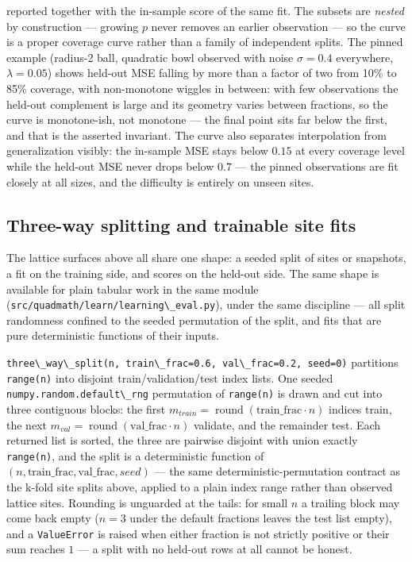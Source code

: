 \documentclass[
  10pt,
]{article}
\newcommand{\passthrough}[1]{#1}
\begin{document}
reported together with the in-sample score of the same fit. The subsets
are \emph{nested} by construction --- growing \(p\) never removes an
earlier observation --- so the curve is a proper coverage curve rather
than a family of independent splits. The pinned example (radius-2 ball,
quadratic bowl observed with noise \(\sigma = 0.4\) everywhere,
\(\lambda = 0.05\)) shows held-out MSE falling by more than a factor of
two from 10\% to 85\% coverage, with non-monotone wiggles in between:
with few observations the held-out complement is large and its geometry
varies between fractions, so the curve is monotone-ish, not monotone ---
the final point sits far below the first, and that is the asserted
invariant. The curve also separates interpolation from generalization
visibly: the in-sample MSE stays below \(0.15\) at every coverage level
while the held-out MSE never drops below \(0.7\) --- the pinned
observations are fit closely at all sizes, and the difficulty is
entirely on unseen sites.

\subsection{Three-way splitting and trainable site
fits}\label{sec:learn_three_way_site_fits}

The lattice surfaces above all share one shape: a seeded split of sites
or snapshots, a fit on the training side, and scores on the held-out
side. The same shape is available for plain tabular work in the same
module (\passthrough{\lstinline!src/quadmath/learn/learning\_eval.py!}),
under the same discipline --- all split randomness confined to the
seeded permutation of the split, and fits that are pure deterministic
functions of their inputs.

\passthrough{\lstinline!three\_way\_split(n, train\_frac=0.6, val\_frac=0.2, seed=0)!}
partitions \passthrough{\lstinline!range(n)!} into disjoint
train/validation/test index lists. One seeded
\passthrough{\lstinline!numpy.random.default\_rng!} permutation of
\passthrough{\lstinline!range(n)!} is drawn and cut into three
contiguous blocks: the first \(m_{train} =
\operatorname{round}(\mathrm{train\_frac} \cdot n)\) indices train, the
next \(m_{val} = \operatorname{round}(\mathrm{val\_frac} \cdot n)\)
validate, and the remainder test. Each returned list is sorted, the
three are pairwise disjoint with union exactly
\passthrough{\lstinline!range(n)!}, and the split is a deterministic
function of \((n, \mathrm{train\_frac}, \mathrm{val\_frac}, seed)\) ---
the same deterministic-permutation contract as the k-fold site splits
above, applied to a plain index range rather than observed lattice
sites. Rounding is unguarded at the tails: for small \(n\) a trailing
block may come back empty (\(n = 3\) under the default fractions leaves
the test list empty), and a \passthrough{\lstinline!ValueError!} is
raised when either fraction is not strictly positive or their sum
reaches \(1\) --- a split with no held-out rows at all cannot be honest.
\end{document}
